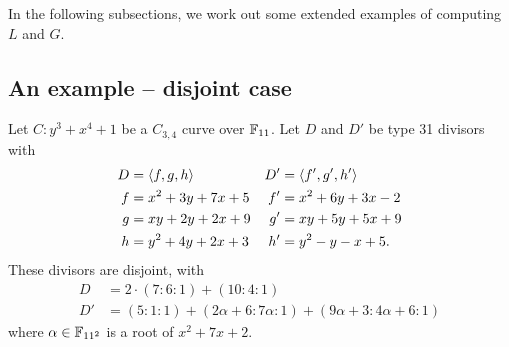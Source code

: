 In the following subsections, we work out some extended examples of computing $L$ and $G$.




\subsection{An example -- disjoint case}

Let $C : y^3 + x^4 + 1$ be a $C_{3,4}$ curve over $\mathbb{F}_{11}$.
Let $D$ and $D'$ be type 31 divisors with
\begin{align*}
  D  &= \left\langle f, g, h \right\rangle     & D' &= \left\langle f', g', h' \right\rangle \\
  f  &= x^2 + 3y + 7x + 5 & f' &= x^2 + 6y + 3x - 2 \\
  g  &= xy + 2y + 2x + 9  & g' &= xy + 5y + 5x + 9 \\
  h  &= y^2 + 4y + 2x + 3 & h' &= y^2 - y - x + 5.
\end{align*}
These divisors are disjoint, with
\begin{align*}
  D &= 2 \cdot (7 : 6 : 1) + (10 : 4 : 1) \\
  D' &= (5 : 1 : 1) + (2\alpha + 6 : 7\alpha : 1) + (9\alpha + 3 : 4\alpha + 6 : 1)
\end{align*}
where $\alpha \in \mathbb{F}_{11^2}$ is a root of $x^2 + 7x + 2$.

